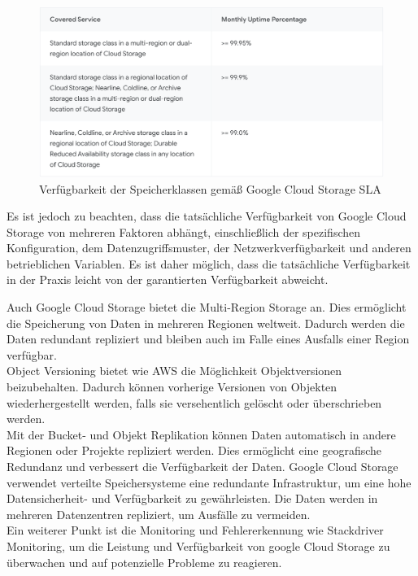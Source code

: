 \begin{figure}[h]
	\centering
	\includegraphics[width=12cm,keepaspectratio]{Pictures/GCSLA.png}
	\caption{Verfügbarkeit der Speicherklassen gemäß Google Cloud Storage SLA  }
\end{figure}

Es ist jedoch zu beachten, dass die tatsächliche Verfügbarkeit von Google Cloud Storage von mehreren Faktoren abhängt, einschließlich der spezifischen Konfiguration, dem Datenzugriffsmuster, der Netzwerkverfügbarkeit und anderen betrieblichen Variablen. Es ist daher möglich, dass die tatsächliche Verfügbarkeit in der Praxis leicht von der garantierten Verfügbarkeit abweicht.

Auch Google Cloud Storage bietet die Multi-Region Storage an. Dies ermöglicht die Speicherung von Daten in mehreren Regionen weltweit. Dadurch werden die Daten redundant repliziert und bleiben auch im Falle eines Ausfalls einer Region verfügbar.\\ 

Object Versioning bietet wie AWS die Möglichkeit Objektversionen beizubehalten. Dadurch können vorherige Versionen von Objekten wiederhergestellt werden, falls sie versehentlich gelöscht oder überschrieben werden.\\

Mit der Bucket- und Objekt Replikation können Daten automatisch in andere Regionen oder Projekte repliziert werden. Dies ermöglicht eine geografische Redundanz und verbessert die Verfügbarkeit der Daten. Google Cloud Storage verwendet verteilte Speichersysteme eine redundante Infrastruktur, um eine hohe Datensicherheit- und Verfügbarkeit zu gewährleisten. Die Daten werden in mehreren Datenzentren repliziert, um Ausfälle zu vermeiden.\\

Ein weiterer Punkt ist die Monitoring und Fehlererkennung wie Stackdriver Monitoring, um die Leistung und Verfügbarkeit von google Cloud Storage zu überwachen und auf potenzielle Probleme zu reagieren.

